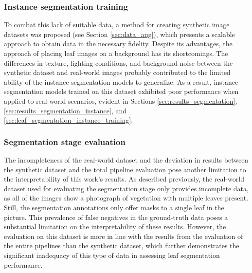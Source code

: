 \documentclass[draft,final]{vutinfth} %
\begin{document}
\subsubsection{Instance segmentation training}
To combat this lack of suitable data, a method for creating synthetic image datasets was proposed (see Section \ref{sec:data_aug}), which presents a scalable approach to obtain data in the necessary fidelity. 
Despite its advantages, the approach of placing leaf images on a background has its shortcomings. The differences in texture, lighting conditions, and background noise between the synthetic dataset and real-world images probably contributed to the limited ability of the instance segmentation models to generalize. As a result, instance segmentation models trained on this dataset exhibited poor performance when applied to real-world scenarios, evident in Sections \ref{sec:results_segmentation}, \ref{sec:results_segmentation_instance}, and \ref{sec:leaf_segmentation_instance_training}.

\subsubsection{Segmentation stage evaluation}
The incompleteness of the real-world dataset and the deviation in results between the synthetic dataset and the total pipeline evaluation pose another limitation to the interpretability of this work's results. 
As described previously, the real-world dataset used for evaluating the segmentation stage only provides incomplete data, as all of the images show a photograph of vegetation with multiple leaves present. Still, the segmentation annotations only offer masks to a single leaf in the picture. This prevalence of false negatives in the ground-truth data poses a substantial limitation on the interpretability of these results. However, the evaluation on this dataset is more in line with the results from the evaluation of the entire pipelines than the synthetic dataset, which further demonstrates the significant inadequacy of this type of data in assessing leaf segmentation performance. 
\end{document}
